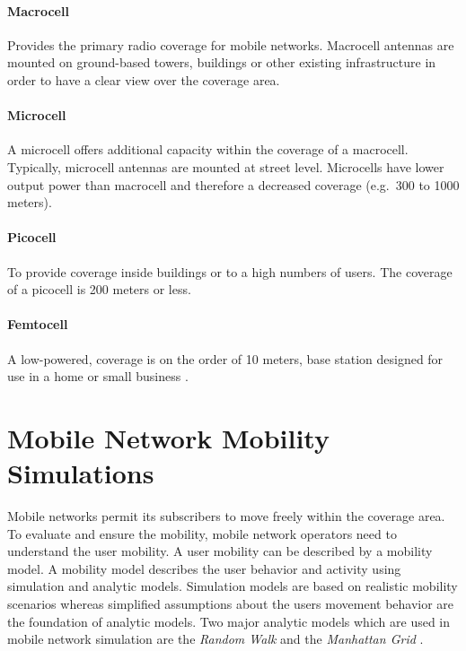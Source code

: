 \documentclass[master,english]{hgbthesis}
\begin{document}
\paragraph{Macrocell} Provides the primary radio coverage for mobile networks. Macrocell antennas are mounted on ground-based towers, buildings or other existing infrastructure in order to have a clear view over the coverage area. 
\paragraph{Microcell} A microcell offers additional capacity within the coverage of a macrocell. Typically, microcell antennas are mounted at street level. Microcells have lower output power than macrocell and therefore a decreased coverage (e.g.\ 300 to 1000 meters).
\paragraph{Picocell} To provide coverage inside buildings or to a high numbers of users. The coverage of a picocell is 200 meters or less.
\paragraph{Femtocell} A low-powered, coverage is on the order of 10 meters, base station designed for use in a home or small business \cite{Zhang2011}.
\section{Mobile Network Mobility Simulations}
Mobile networks permit its subscribers to move freely within the coverage area. To evaluate and ensure the mobility, mobile network operators need to understand the user mobility. A user mobility can be described by a mobility model. A mobility model describes the user behavior and activity using simulation and analytic models. Simulation models are based on realistic mobility scenarios whereas simplified assumptions about the users movement behavior are the foundation of analytic models.
Two major analytic models which are used in mobile network simulation are the \emph{Random Walk} \cite{Akyildiz2000,Bettstetter2001,Bettstetter2002} and the \emph{Manhattan Grid} \cite{Markoulidakis1997}.
\end{document}
